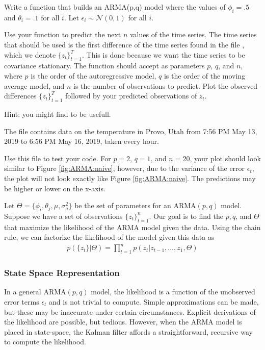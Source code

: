 \begin{problem}
Write a function  that builds an ARMA(p,q) model where the values of $\phi_i=.5$ and $\theta_i=.1$ for all $i$.
Let $\epsilon_i\sim\mathscr{N}(0,1)$ for all $i$.

Use your function to predict the next $n$ values of the time series. 
The time series that should be used is the first difference of the time series found in the file , which we denote $\{z_t\}_{t=1}^T$.
This is done because we want the time series to be covariance stationary.
The function should accept as parameters $p$, $q$, and $n$, where $p$ is the order of the autoregressive model, $q$ is the order of the moving average model, and $n$ is the number of observations to predict.
Plot the observed differences $\{z_t\}_{t=1}^T$ followed by your predicted observations of $z_t$.

\noindent Hint: you might find  to be usefull.

The file  contains data on the temperature in Provo, Utah from 7:56 PM May 13, 2019 to 6:56 PM May 16, 2019, taken every hour.

Use this file to test your code.
For $p=2$, $q=1$, and $n=20$, your plot should look similar to Figure \ref{fig:ARMA:naive}, however, due to the variance of the error $\epsilon_t$, the plot will not look exactly like Figure \ref{fig:ARMA:naive}.
The predictions may be higher or lower on the x-axis.
\label{prob:arma:naive}
\end{problem}

Let $\Theta = \{\phi_i, \theta_j, \mu, \sigma_a^2\}$ be the set of parameters
for an $\text{ARMA}(p,q)$ model.
Suppose we have a set of observations $\{z_t\}_{t=1}^n$.
Our goal is to find the $p,q$, and $\Theta$ that maximize the likelihood of the ARMA model given the data.
Using the chain rule, we can factorize the likelihood of the model given this data as
\begin{align}
    \label{eq:arma:factorized}
    p(\{z_t\} | \Theta) = \prod_{t=1}^{n} p(z_t | z_{t-1}, \ldots, z_{1},
    \Theta)
\end{align}

\subsubsection*{State Space Representation}

In a general $\text{ARMA}(p,q)$ model, the likelihood is a function of the
unobserved error terms $\epsilon_t$ and is not trivial to compute.
Simple approximations can be made, but these may be inaccurate under certain
circumstances.
Explicit derivations of the likelihood are possible, but
tedious.
However, when the $\text{ARMA}$ model is placed in state-space, the
Kalman filter affords a straightforward, recursive way to compute the
likelihood.

